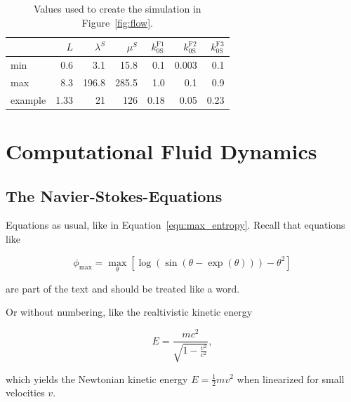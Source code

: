 \documentclass[11pt,table]{article}
\begin{document}
\lipsum[2-3]


\begin{table}[]
	\centering
	\begin{tabular}{@{} lrrrrrr @{}} 
		\toprule
		 & $L$ & $\lambda^S$ & $\mu^S$ & $k_{0\text{S}}^{\text{F}1}$ & $k_{0\text{S}}^{\text{F}2}$ & $k_{0\text{S}}^{\text{F}3}$ \\
		\midrule
		min & 0.6 & 3.1 & 15.8 & 0.1 & 0.003 & 0.1 \\
		max & 8.3 & 196.8 & 285.5 & 1.0 & 0.1 & 0.9 \\
		example & 1.33 & 21 & 126 & 0.18 & 0.05 & 0.23 \\
		\bottomrule
	\end{tabular}
	\caption{Values used to create the simulation in Figure~\ref{fig:flow}.}\label{tab:other_parameters}
\end{table}


\section{Computational Fluid Dynamics}

\subsection{The Navier-Stokes-Equations}

Equations as usual, like in Equation~\ref{equ:max_entropy}. Recall that equations like

\begin{equation}\label{equ:max_entropy}
	\phi_\mathrm{max} = \max_{\theta} \left[ \log(\sin(\theta - \exp(\theta))) - \theta^2 \right]
\end{equation}

are part of the text and should be treated like a word.

\lipsum[1]

Or without numbering, like the realtivistic kinetic energy 

\begin{equation*}
	E = \frac{mc^2}{\sqrt{1 - \frac{v^2}{c^2}}},
\end{equation*}

which yields the Newtonian kinetic energy $E = \frac 1 2 m v^2$ when linearized for small velocities $v$.
\end{document}
